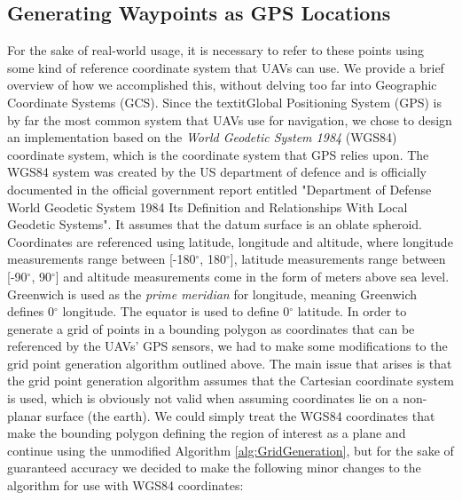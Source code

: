 



\subsection{Generating Waypoints as GPS Locations}
For the sake of real-world usage, it is necessary to refer to these points using some kind of reference coordinate system that UAVs can use. We provide a brief overview of how we accomplished this, without delving too far into Geographic Coordinate Systems (GCS). Since the textit{Global Positioning System} (GPS) is by far the most common system that UAVs use for navigation, we chose to design an implementation based on the \textit{World Geodetic System 1984} (WGS84) coordinate system, which is the coordinate system that GPS relies upon. The WGS84 system was created by the US department of defence and is officially documented in the official government report entitled "Department of Defense World Geodetic System 1984 Its Definition and Relationships With Local Geodetic Systems". It assumes that the datum surface is an oblate spheroid.
Coordinates are referenced using latitude, longitude and altitude, where longitude measurements range between [-180$^{\circ}$, 180$^{\circ}$], latitude measurements range between [-90$^{\circ}$, 90$^{\circ}$] and altitude measurements come in the form of meters above sea level. Greenwich is used as the \textit{prime meridian} for longitude, meaning Greenwich defines 0$^{\circ}$ longitude. The equator is used to define 0$^{\circ}$ latitude. In order to generate a grid of points in a bounding polygon as coordinates that can be referenced by the UAVs' GPS sensors, we had to make some modifications to the grid point generation algorithm outlined above. The main issue that arises is that the grid point generation algorithm assumes that the Cartesian coordinate system is used, which is obviously not valid when assuming coordinates lie on a  non-planar surface (the earth). We could simply treat the WGS84 coordinates that make the bounding polygon defining the region of interest as a plane and continue using the unmodified Algorithm \ref{alg:GridGeneration}, but for the sake of guaranteed accuracy we decided to make the following minor changes to the algorithm for use with WGS84 coordinates:
